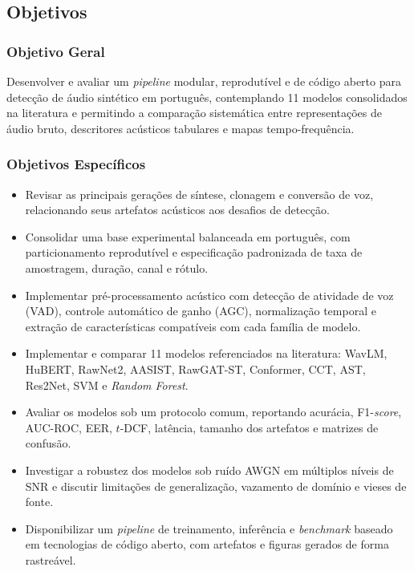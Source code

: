 \documentclass[12pt,a4paper]{article}
\begin{document}
\newpage

\subsection{Objetivos}

\subsubsection{Objetivo Geral}

Desenvolver e avaliar um \textit{pipeline} modular, reprodutível e de código
aberto para detecção de áudio sintético em português, contemplando
\num{11} modelos consolidados na literatura e permitindo a comparação
sistemática entre representações de áudio bruto, descritores acústicos
tabulares e mapas tempo-frequência.

\subsubsection{Objetivos Específicos}
\begin{itemize}
    \item Revisar as principais gerações de síntese, clonagem e conversão de
    voz, relacionando seus artefatos acústicos aos desafios de detecção.
    \item Consolidar uma base experimental balanceada em português, com
    particionamento reprodutível e especificação padronizada de taxa de
    amostragem, duração, canal e rótulo.
    \item Implementar pré-processamento acústico com detecção de atividade de
    voz (VAD), controle automático de ganho (AGC), normalização temporal e
    extração de características compatíveis com cada família de modelo.
    \item Implementar e comparar \num{11} modelos referenciados na literatura:
    WavLM, HuBERT, RawNet2, AASIST, RawGAT-ST, Conformer, CCT, AST, Res2Net,
    SVM e \textit{Random Forest}.
    \item Avaliar os modelos sob um protocolo comum, reportando acurácia,
    F1-\textit{score}, AUC-ROC, EER, $t$-DCF, latência, tamanho dos artefatos
    e matrizes de confusão.
    \item Investigar a robustez dos modelos sob ruído AWGN em múltiplos níveis
    de SNR e discutir limitações de generalização, vazamento de domínio e
    vieses de fonte.
    \item Disponibilizar um \textit{pipeline} de treinamento, inferência e
    \textit{benchmark} baseado em tecnologias de código aberto, com artefatos e
    figuras gerados de forma rastreável.
\end{itemize}
\end{document}
